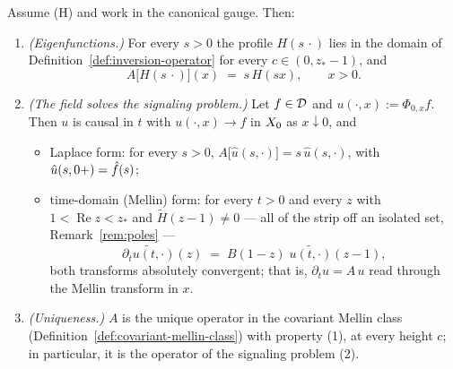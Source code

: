 \begin{theorem}\label{thm:signaling-form}
Assume (H) and work in the canonical gauge. Then:
\begin{enumerate}
\item \emph{(Eigenfunctions.)} For every $s > 0$ the profile $H(s\,\cdot)$ lies in the domain
of Definition~\ref{def:inversion-operator} for every $c \in (0, z_*-1)$, and
\[
  A\bigl[H(s\,\cdot)\bigr](x) \;=\; s\, H(sx), \qquad x > 0 .
\]
\item \emph{(The field solves the signaling problem.)} Let $f \in \mathcal{D}$ and
$u(\cdot, x) := \Phi_{0,x} f$. Then $u$ is causal in $t$ with $u(\cdot, x) \to f$ in $X_0$ as
$x \downarrow 0$, and
\begin{itemize}
\item Laplace form: for every $s > 0$, $A\bigl[\hat u(s, \cdot)\bigr] = s\,\hat u(s, \cdot)$,
with $\hat u(s, 0{+}) = \hat f(s)$;
\item time-domain (Mellin) form: for every $t > 0$ and every $z$ with
$1 < \operatorname{Re} z < z_*$ and $\tilde H(z-1) \ne 0$ --- all of the strip off an isolated
set, Remark~\ref{rem:poles} ---
\[
  \widetilde{\partial_t u(t, \cdot)}(z) \;=\; B(1 - z)\;\widetilde{u(t, \cdot)}(z - 1),
\]
both transforms absolutely convergent; that is, $\partial_t u = A\,u$ read through the Mellin
transform in $x$.
\end{itemize}
\item \emph{(Uniqueness.)} $A$ is the unique operator in the covariant Mellin class
(Definition~\ref{def:covariant-mellin-class}) with property (1), at every height $c$; in
particular, it is the operator of the signaling problem (2).
\end{enumerate}
\end{theorem}

